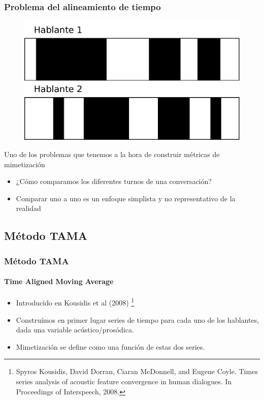 \begin{frame}
  \frametitle{Problema del alineamiento de tiempo}

  \begin{figure}[t]
    \includegraphics[scale=0.40]{images/conversation_turns.pdf}
  \end{figure}
  Uno de los problemas que tenemos a la hora de construir métricas de mimetización

  \begin{itemize}
    \item ¿Cómo comparamos los diferentes turnos de una conversación?
    \item Comparar uno a uno es un enfoque simplista y no representativo de la realidad
  \end{itemize}
\end{frame}


\subsection{Método TAMA}

\begin{frame}
  \frametitle{Método TAMA}
  \framesubtitle{Time Aligned Moving Average}
  \begin{itemize}
    \item Introducido en Kousidis et al (2008) \footnote{Spyros Kousidis, David Dorran, Ciaran McDonnell, and Eugene Coyle. Times series analysis of acoustic feature convergence in human dialogues. In
Proceedings of Interspeech, 2008.}
    \item Construímos en primer lugar series de tiempo para cada uno de los hablantes, dada una variable acústico/prosódica.
    \item Mimetización se define como una función de estas dos series.
  \end{itemize}
\end{frame}



